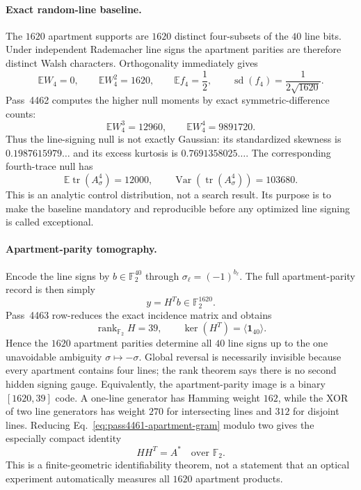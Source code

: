 \paragraph{Exact random-line baseline.}
The $1620$ apartment supports are $1620$ distinct four-subsets of the $40$ line
bits.  Under independent Rademacher line signs the apartment parities are
therefore distinct Walsh characters.  Orthogonality immediately gives
\[
 \mathbb E W_4=0,
 \qquad
 \mathbb E W_4^2=1620,
 \qquad
 \mathbb E f_4=\frac12,
 \qquad
 \operatorname{sd}(f_4)=\frac{1}{2\sqrt{1620}}.
\]
Pass~4462 computes the higher null moments by exact symmetric-difference counts:
\begin{equation}
 \boxed{
 \mathbb E W_4^3=12960,
 \qquad
 \mathbb E W_4^4=9891720.}
 \label{eq:pass4462-null-moments}
\end{equation}
Thus the line-signing null is not exactly Gaussian: its standardized skewness is
$0.1987615979\ldots$ and its excess kurtosis is
$0.7691358025\ldots$.  The corresponding fourth-trace null has
\[
 \mathbb E\operatorname{tr}(A_\sigma^4)=12000,
 \qquad
 \operatorname{Var}\!\left(\operatorname{tr}(A_\sigma^4)\right)=103680.
\]
This is an analytic control distribution, not a search result.  Its purpose is
to make the baseline mandatory and reproducible before any optimized line
signing is called exceptional.

\paragraph{Apartment-parity tomography.}
Encode the line signs by $b\in\mathbb F_2^{40}$ through
$\sigma_\ell=(-1)^{b_\ell}$.  The full apartment-parity record is then simply
\[
 y=H^Tb\in\mathbb F_2^{1620}.
\]
Pass~4463 row-reduces the exact incidence matrix and obtains
\begin{equation}
 \boxed{\operatorname{rank}_{\mathbb F_2}H=39,}
 \qquad
 \boxed{\ker(H^T)=\langle\mathbf 1_{40}\rangle.}
 \label{eq:pass4463-tomography}
\end{equation}
Hence the $1620$ apartment parities determine all $40$ line signs up to the one
unavoidable ambiguity $\sigma\mapsto-\sigma$.  Global reversal is necessarily
invisible because every apartment contains four lines; the rank theorem says
there is no second hidden signing gauge.  Equivalently, the apartment-parity
image is a binary $[1620,39]$ code.  A one-line generator has Hamming weight
$162$, while the XOR of two line generators has weight $270$ for intersecting
lines and $312$ for disjoint lines.  Reducing
Eq.~\eqref{eq:pass4461-apartment-gram} modulo two gives the especially compact
identity
\begin{equation}
 \boxed{HH^T=A^\ast\quad\text{over }\mathbb F_2.}
 \label{eq:pass4463-mod2-gram}
\end{equation}
This is a finite-geometric identifiability theorem, not a statement that an
optical experiment automatically measures all $1620$ apartment products.


